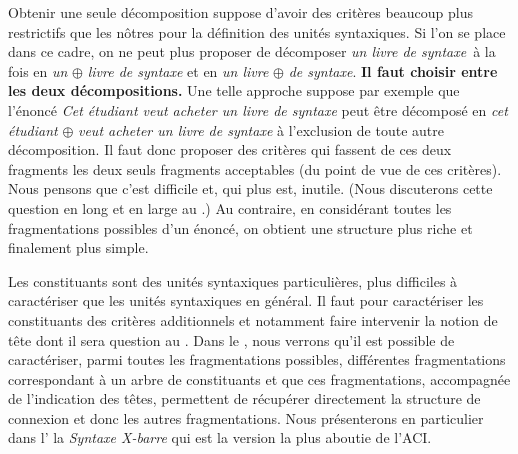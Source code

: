 Obtenir une seule décomposition suppose d’avoir des critères beaucoup plus restrictifs que les nôtres pour la définition des unités syntaxiques. Si l’on se place dans ce cadre, on ne peut plus proposer de décomposer \textit{un livre de syntaxe}~à la fois en \textit{un} ${\oplus}$ \textit{livre de syntaxe} et en \textit{un livre} ${\oplus}$ \textit{de syntaxe}. \textbf{Il faut choisir entre les deux décompositions.} Une telle approche suppose par exemple que l’énoncé \textit{Cet étudiant veut acheter un livre de syntaxe} peut être décomposé en \textit{cet étudiant} ${\oplus}$ \textit{veut acheter un livre de syntaxe} à l’exclusion de toute autre décomposition. Il faut donc proposer des critères qui fassent de ces deux fragments les deux seuls fragments acceptables (du point de vue de ces critères). Nous pensons que c’est difficile et, qui plus est, inutile. (Nous discuterons cette question en long et en large au .) Au contraire, en considérant toutes les fragmentations possibles d’un énoncé, on obtient une structure plus riche et finalement plus simple.

Les constituants sont des unités syntaxiques particulières, plus difficiles à caractériser que les unités syntaxiques en général. Il faut pour caractériser les constituants des critères additionnels et notamment faire intervenir la notion de tête dont il sera question au . Dans le , nous verrons qu’il est possible de caractériser, parmi toutes les fragmentations possibles, différentes fragmentations correspondant à un arbre de constituants et que ces fragmentations, accompagnée de l’indication des têtes, permettent de récupérer directement la structure de connexion et donc les autres fragmentations. Nous présenterons en particulier dans l’ la \textit{Syntaxe X-barre} qui est la version la plus aboutie de l’ACI.


